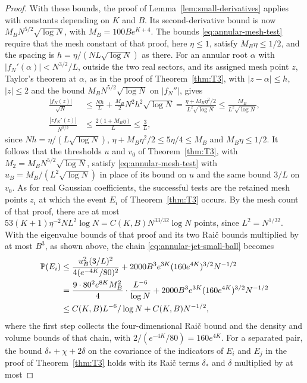 \begin{proof}
With these bounds, the proof of Lemma~\ref{lem:small-derivatives}
applies with constants depending on $K$ and $B$.
Its second-derivative bound is now $M_BN^{5/2}\sqrt{\log N}$, with
$M_B=100Be^{K+4}$. The bounds \eqref{eq:annular-mesh-test} require that
the mesh constant of that proof, here $\eta\le1$, satisfy
$M_B\eta\le1/2$, and the spacing is $h=\eta/(NL\sqrt{\log N})$ as there.
For an annular root $\alpha$ with $|f_N'(\alpha)|<N^{3/2}/L$, outside the
two real sectors, and its assigned mesh point $z$, Taylor's theorem at
$\alpha$, as in the proof of Theorem~\ref{thm:T3}, with $|z-\alpha|\le h$, $|z|\le2$ and the
bound $M_BN^{5/2}\sqrt{\log N}$ on $|f_N''|$, gives
\begin{align*}
 \frac{|f_N(z)|}{\sqrt N}
 &\le\frac{Nh}L+\frac{M_B}2N^2h^2\sqrt{\log N}
 =\frac{\eta+M_B\eta^2/2}{L^2\sqrt{\log N}}
 \le\frac{M_B}{L^2\sqrt{\log N}},\\
 \frac{|zf_N'(z)|}{N^{3/2}}
 &\le\frac{2(1+M_B\eta)}L
 \le\frac3L,
\end{align*}
since $Nh=\eta/(L\sqrt{\log N})$, $\eta+M_B\eta^2/2\le5\eta/4\le M_B$ and
$M_B\eta\le1/2$.
It follows that the thresholds $u$ and $v_0$ of Theorem~\ref{thm:T3},
with $M_2=M_BN^{5/2}\sqrt{\log N}$, satisfy \eqref{eq:annular-mesh-test}
with $u_B=M_B/(L^2\sqrt{\log N})$ in place of its bound on $u$ and the
same bound $3/L$ on $v_0$.
As for real Gaussian coefficients, the successful tests are the retained
mesh points $z_i$ at which the event $E_i$ of Theorem~\ref{thm:T3}
occurs.
By the mesh count of that proof, there are at most
$53(K+1)\eta^{-2}NL^2\log N=C(K,B)N^{33/32}\log N$ points, since
$L^2=N^{1/32}$.
With the eigenvalue bounds of that proof and its two Rai\v{c} bounds
multiplied by at most $B^3$, as shown above, the chain
\eqref{eq:annular-jet-small-ball} becomes
\begin{align*}
 \mathbb P(E_i)
 &\le\frac{u_B^2(3/L)^2}{4(e^{-4K}/80)^2}
   +2000B^3e^{3K}(160e^{4K})^{3/2}N^{-1/2}\\
 &=\frac{9\cdot80^2e^{8K}M_B^2}4\cdot\frac{L^{-6}}{\log N}
   +2000B^3e^{3K}(160e^{4K})^{3/2}N^{-1/2}\\
 &\le C(K,B)L^{-6}/\log N+C(K,B)N^{-1/2},
\end{align*}
where the first step collects the four-dimensional Rai\v{c} bound and the
density and volume bounds of that chain, with $2/(e^{-4K}/80)=160e^{4K}$.
For a separated pair, the bound $\delta_*+\chi+2\delta$ on the covariance
of the indicators of $E_i$ and $E_j$ in the proof of Theorem~\ref{thm:T3} holds
with its Rai\v{c} terms $\delta_*$ and $\delta$ multiplied by at most

\end{proof}
